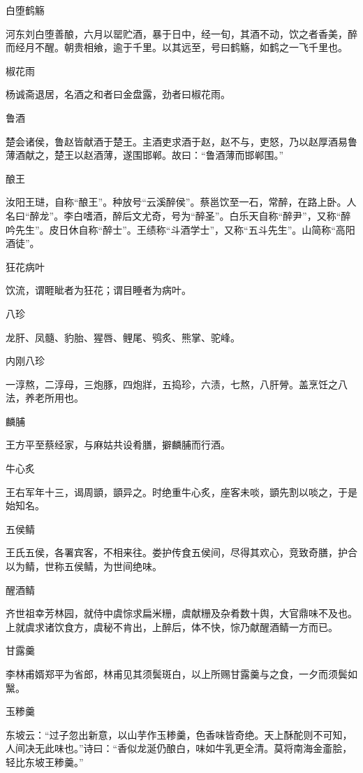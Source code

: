 \documentclass[a4paper,12pt,UTF8,twoside]{ctexbook}
\begin{document}
    白堕鹤觞
    
    河东刘白堕善酿，六月以罂贮酒，暴于日中，经一旬，其酒不动，饮之者香美，醉而经月不醒。朝贵相飨，逾于千里。以其远至，号曰鹤觞，如鹤之一飞千里也。
    
    椒花雨
    
    杨诚斋退居，名酒之和者曰金盘露，劲者曰椒花雨。
    
    鲁酒
    
    楚会诸侯，鲁赵皆献酒于楚王。主酒吏求酒于赵，赵不与，吏怒，乃以赵厚酒易鲁薄酒献之，楚王以赵酒薄，遂围邯郸。故曰：“鲁酒薄而邯郸围。”
    
    酿王
    
    汝阳王琎，自称“酿王”。种放号“云溪醉侯”。蔡邕饮至一石，常醉，在路上卧。人名曰“醉龙”。李白嗜酒，醉后文尤奇，号为“醉圣”。白乐天自称“醉尹”，又称“醉吟先生”。皮日休自称“醉士”。王绩称“斗酒学士”，又称“五斗先生”。山简称“高阳酒徒”。
    
    狂花病叶
    
    饮流，谓睚眦者为狂花；谓目睡者为病叶。
    
    八珍
    
    龙肝、凤髓、豹胎、猩唇、鲤尾、鸮炙、熊掌、驼峰。
    
    内刚八珍
    
    一淳熬，二淳母，三炮豚，四炮牂，五捣珍，六渍，七熬，八肝膋。盖烹饪之八法，养老所用也。
    
    麟脯
    
    王方平至蔡经家，与麻姑共设肴膳，擗麟脯而行酒。
    
    牛心炙
    
    王右军年十三，谒周顗，顗异之。时绝重牛心炙，座客未啖，顗先割以啖之，于是始知名。
    
    五侯鲭
    
    王氏五侯，各署宾客，不相来往。娄护传食五侯间，尽得其欢心，竞致奇膳，护合以为鲭，世称五侯鲭，为世间绝味。
    
    醒酒鲭
    
    齐世祖幸芳林园，就侍中虞悰求扁米粣，虞献粣及杂肴数十舆，大官鼎味不及也。上就虞求诸饮食方，虞秘不肯出，上醉后，体不快，悰乃献醒酒鲭一方而已。
    
    甘露羹
    
    李林甫婿郑平为省郎，林甫见其须鬓斑白，以上所赐甘露羹与之食，一夕而须鬓如黳。
    
    玉糁羹
    
    东坡云：“过子忽出新意，以山芋作玉糁羹，色香味皆奇绝。天上酥酡则不可知，人间决无此味也。”诗曰：“香似龙涎仍酿白，味如牛乳更全清。莫将南海金齑脍，轻比东坡王糁羹。”
    
\end{document}
